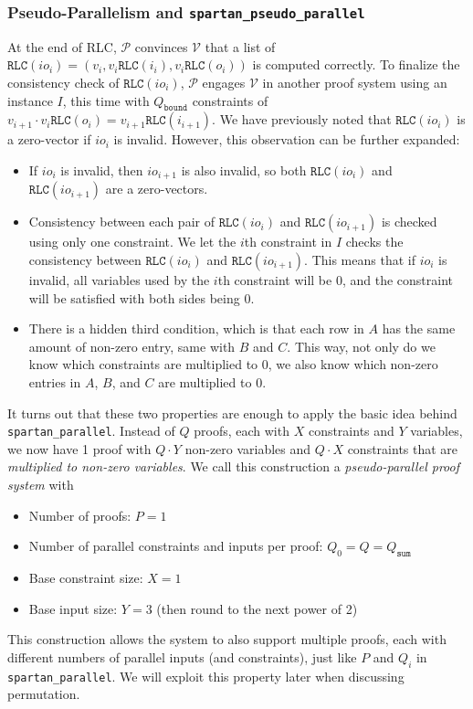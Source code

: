 \documentclass{article}
\newcommand{\red}[1] {\color{red}#1\color{black}}
\newcommand{\code}{\texttt}
\newcommand{\Qbound}{Q_{\mathtt{bound}}}
\newcommand{\Qsum}{Q_{\mathtt{sum}}}
\renewcommand{\P}{\mathcal{P}}
\newcommand{\V}{\mathcal{V}}
\newcommand{\RLC}{\mathtt{RLC}}
\begin{document}
\subsubsection{Pseudo-Parallelism and \code{spartan\_pseudo\_parallel}}

At the end of RLC, $\P$ convinces $\V$ that a list of $\RLC(io_i) = (v_i, v_i\RLC(i_i), v_i\RLC(o_i))$ is computed correctly. To finalize the consistency check of $\RLC(io_i)$, $\P$ engages $\V$ in another proof system using an instance $I$, this time with $\Qbound$ constraints of $v_{i+1}\cdot v_i\RLC(o_i) = v_{i+1}\RLC(i_{i+1})$. We have previously noted that $\RLC(io_i)$ is a zero-vector if $io_i$ is invalid. However, this observation can be further expanded:
\begin{itemize}
    \item If $io_i$ is invalid, then $io_{i+1}$ is also invalid, so both $\RLC(io_i)$ and $\RLC(io_{i+1})$ are a zero-vectors.
    \item Consistency between each pair of $\RLC(io_i)$ and $\RLC(io_{i+1})$ is checked using only one constraint. We let the $i$th constraint in $I$ checks the consistency between $\RLC(io_i)$ and $\RLC(io_{i+1})$. This means that if $io_i$ is invalid, all variables used by the $i$th constraint will be 0, and the constraint will be satisfied with both sides being 0.
    \item \red{There is a hidden third condition, which is that each row in $A$ has the same amount of non-zero entry, same with $B$ and $C$. This way, not only do we know which constraints are multiplied to 0, we also know which non-zero entries in $A$, $B$, and $C$ are multiplied to 0.}
\end{itemize}
It turns out that these two properties are enough to apply the basic idea behind \code{spartan\_parallel}. Instead of $Q$ proofs, each with $X$ constraints and $Y$ variables, we now have 1 proof with $Q\cdot Y$ non-zero variables and $Q\cdot X$ constraints that are \emph{multiplied to non-zero variables}. We call this construction a \emph{pseudo-parallel proof system} with
\begin{itemize}
    \item Number of proofs: $P = 1$
    \item Number of parallel constraints and inputs per proof: $Q_0 = Q = \Qsum$
    \item Base constraint size: $X = 1$
    \item Base input size: $Y = 3$ (then round to the next power of 2)
\end{itemize}
This construction allows the system to also support multiple proofs, each with different numbers of parallel inputs (and constraints), just like $P$ and $Q_i$ in \code{spartan\_parallel}. We will exploit this property later when discussing permutation.
\end{document}
